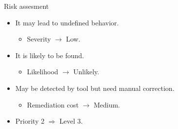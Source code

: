 \begin{frame}[t]{Risk assesment}
\begin{itemize}
  \item It may lead to undefined behavior.
    \begin{itemize}
      \item Severity $\rightarrow$ Low.
    \end{itemize}

  \vfill
  \item It is likely to be found.
    \begin{itemize}
      \item Likelihood $\rightarrow$ Unlikely.
    \end{itemize}

  \vfill
  \item May be detected by tool but need manual correction.
    \begin{itemize}
      \item Remediation cost $\rightarrow$ Medium.
    \end{itemize}

  \vfill
  \item Priority 2 $\Rightarrow$ Level 3.
\end{itemize}
\end{frame}
